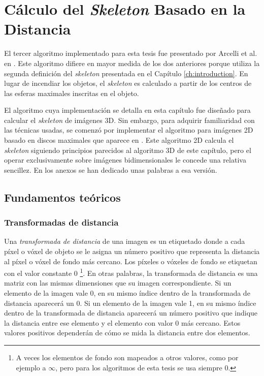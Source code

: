 \chapter{Cálculo del \textit{Skeleton} Basado en la Distancia}
\label{ch:arcelli}

El tercer algoritmo implementado para esta tesis fue presentado por Arcelli et al. en \cite{arcelli2011distance}. Este algoritmo difiere en mayor medida de los dos anteriores porque utiliza la segunda definición del \textit{skeleton} presentada en el Capítulo \ref{ch:introduction}. En lugar de incendiar los objetos, el \textit{skeleton} es calculado a partir de los centros de las esferas maximales inscritas en el objeto.

El algoritmo cuya implementación se detalla en esta capítulo fue diseñado para calcular el \textit{skeleton} de imágenes 3D. Sin embargo, para adquirir familiaridad con las técnicas usadas, se comenzó por implementar el algoritmo para imágenes 2D basado en discos maximales que aparece en \cite{di1996skeletonization}. Este algoritmo 2D calcula el \textit{skeleton} siguiendo principios parecidos al algoritmo 3D de este capítulo, pero el operar exclusivamente sobre imágenes bidimensionales le concede una relativa sencillez. En los anexos se han dedicado unas palabras a esa versión.

\section{Fundamentos teóricos}

\subsection{Transformadas de distancia}

Una \textit{transformada de distancia} de una imagen es un etiquetado donde a cada píxel o vóxel de objeto se le asigna un número positivo que representa la distancia al píxel o vóxel de fondo más cercano. Los píxeles o vóxeles de fondo se etiquetan con el valor constante 0 \footnote{A veces los elementos de fondo son mapeados a otros valores, como por ejemplo a $\infty$, pero para los algoritmos de esta tesis se usa siempre 0.}. En otras palabras, la transformada de distancia es una matriz con las mismas dimensiones que su imagen correspondiente. Si un elemento de la imagen vale 0, en su mismo índice dentro de la transformada de distancia aparecerá un 0. Si un elemento de la imagen vale 1, en su mismo índice dentro de la transformada de distancia aparecerá un número positivo que indique la distancia entre ese elemento y el elemento con valor 0 más cercano. Estos valores positivos dependerán de cómo se mida la distancia entre dos elementos.

